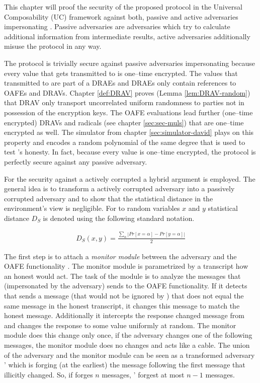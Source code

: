 This chapter will proof the security of the proposed protocol \JWprotoSymOPE
in the Universal Composability (UC) framework \cite{canetti05} against both,
passive and active adversaries impersonating \JWpTwo{}. Passive adversaries are
adversaries which try to calculate additional information from intermediate
results, active adversaries additionally misuse the protocol in any way.

The protocol is trivially secure against passive adversaries impersonating
\JWpTwo{} because every value that gets transmitted to \JWpTwo{} is one--time
encrypted. The values that transmitted to \JWpTwo{} are part of a DRAEs and
DRAEs only contain references to OAFEs and DRAVs. Chapter \ref{def:DRAV} proves
(Lemma \ref{lem:DRAV-random}) that DRAV only transport uncorrelated uniform
randomness to parties not in possession of the encryption keys. The OAFE
evaluations lead further (one--time encrypted) DRAVs and radicals (see chapter
\ref{sec:sec-muls}) that are one--time encrypted as well. The simulator from
chapter \ref{sec:simulator-david} plays on this property and encodes a random
polynomial of the same degree that is used to test \JWpTwo{}'s honesty. In fact,
because every value is one--time encrypted, the protocol is perfectly secure
against any passive adversary.

For the security against a actively corrupted \JWpTwo{} a hybrid argument is
employed. The general idea is to transform a actively corrupted adversary into a
passively corrupted adversary and to show that the statistical distance in the
environment's view is negligible. For to random variables $x$ and $y$
statistical distance $D_S$ is denoted using the following standard notation.

\begin{align*}
  D_S(x, y) = \frac{\sum_\alpha \left|Pr[x=\alpha] - Pr[y=\alpha]\right|}{2}
\end{align*}

\noindent{}The first step is to attach a \emph{monitor module} between the
adversary \JWadv{} and the OAFE functionality \JWfuncSymOAFE{}. The monitor
module is parametrized by a transcript how an honest \JWpTwo{} would act. The
task of the module is to analyze the messages that \JWpTwo{} (impersonated by
the adversary) sends to the OAFE functionality. If it detects that \JWpTwo{}
sends a message (that would not be ignored by \JWfuncSymOAFE{}) that does not
equal the same message in the honest transcript, it changes this message to
match the honest message. Additionally it intercepts the response changed
message from \JWfuncSymOAFE{} and changes the response to some value uniformly
at random. The monitor module does this change only once, if the adversary
changes one of the following messages, the monitor module does no changes and
acts like a cable. The union of the adversary \JWadv{} and the monitor module
can be seen as a transformed adversary \JWadv{}' which is forging (at the
earliest) the message following the first message that \JWadv{} illicitly
changed. So, if \JWadv{} forges $n$ messages, \JWadv{}' forgest at most $n-1$
messages.

